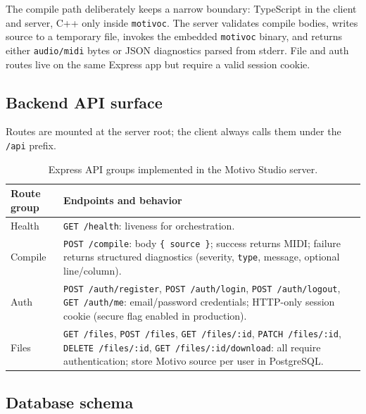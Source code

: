 The compile path deliberately keeps a narrow boundary: TypeScript in the client and server, C++ only inside
\texttt{motivoc}.
The server validates compile bodies, writes source to a temporary file, invokes the embedded \texttt{motivoc}
binary, and
returns either \texttt{audio/midi} bytes or JSON diagnostics parsed from stderr.
File and auth routes live on the same Express app but require a valid session cookie.

\subsection{Backend API surface}\label{subsec:studio-api-surface}

Routes are mounted at the server root; the client always calls them under the \texttt{/api} prefix.

\begin{table}[htbp]
  \centering
  \renewcommand{\arraystretch}{1.25}
  \begin{tabularx}{\textwidth}{@{}M{3.4cm}>{\raggedright\arraybackslash\hspace{0pt}}X@{}}
    \toprule
    \textbf{Route group} & \textbf{Endpoints and behavior} \\
    \midrule
    Health & \texttt{GET /health}: liveness for orchestration. \\
    Compile & \texttt{POST /compile}: body \texttt{\{ source \}}; success returns MIDI; failure returns structured
    diagnostics (severity, \texttt{type}, message, optional line/column). \\
    Auth & \texttt{POST /auth/register}, \texttt{POST /auth/login}, \texttt{POST /auth/logout}, \texttt{GET /auth/me}:
    email/password credentials; HTTP-only session cookie (secure flag enabled in production). \\
    Files & \texttt{GET /files}, \texttt{POST /files}, \texttt{GET /files/:id}, \texttt{PATCH /files/:id},
    \texttt{DELETE /files/:id}, \texttt{GET /files/:id/download}: all require authentication; store Motivo source
    per user in PostgreSQL. \\
    \bottomrule
  \end{tabularx}
  \caption{Express API groups implemented in the Motivo Studio server.}\label{tab:studio-api}
\end{table}

\subsection{Database schema}\label{subsec:studio-database}

